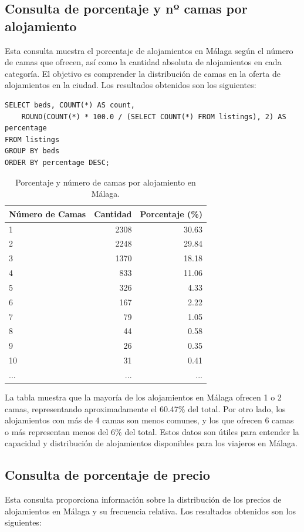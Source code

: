 \subsection{Consulta de porcentaje y nº camas por alojamiento}
Esta consulta muestra el porcentaje de alojamientos en Málaga según el número de camas que ofrecen, así como la cantidad absoluta de alojamientos en cada categoría. El objetivo es comprender la distribución de camas en la oferta de alojamientos en la ciudad. Los resultados obtenidos son los siguientes:
\begin{verbatim}
SELECT beds, COUNT(*) AS count, 
    ROUND(COUNT(*) * 100.0 / (SELECT COUNT(*) FROM listings), 2) AS percentage
FROM listings
GROUP BY beds
ORDER BY percentage DESC;
\end{verbatim}
\begin{table}[h]
\centering
\begin{tabular}{|l|r|r|}
\hline
\textbf{Número de Camas} & \textbf{Cantidad} & \textbf{Porcentaje (\%)} \\ \hline
1 & 2308 & 30.63 \\ \hline
2 & 2248 & 29.84 \\ \hline
3 & 1370 & 18.18 \\ \hline
4 & 833 & 11.06 \\ \hline
5 & 326 & 4.33 \\ \hline
6 & 167 & 2.22 \\ \hline
7 & 79 & 1.05 \\ \hline
8 & 44 & 0.58 \\ \hline
9 & 26 & 0.35 \\ \hline
10 & 31 & 0.41 \\ \hline
... & ... & ... \\ \hline
\end{tabular}
\caption{Porcentaje y número de camas por alojamiento en Málaga.}
\end{table}
\newpage
La tabla muestra que la mayoría de los alojamientos en Málaga ofrecen 1 o 2 camas, representando aproximadamente el 60.47\% del total. Por otro lado, los alojamientos con más de 4 camas son menos comunes, y los que ofrecen 6 camas o más representan menos del 6\% del total. Estos datos son útiles para entender la capacidad y distribución de alojamientos disponibles para los viajeros en Málaga.

\subsection{Consulta de porcentaje de precio}
Esta consulta proporciona información sobre la distribución de los precios de alojamientos en Málaga y su frecuencia relativa.
Los resultados obtenidos son los siguientes:

